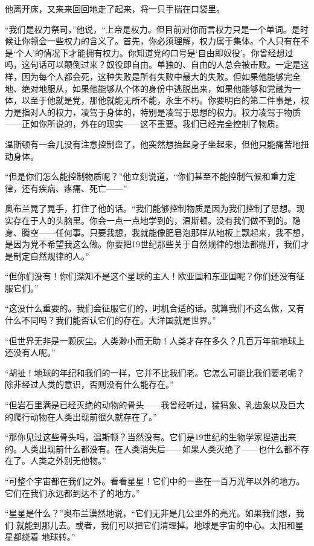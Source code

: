 他离开床，又来来回回地走了起来，将一只手揣在口袋里。

``我们是权力祭司，''他说，``上帝是权力。但目前对你而言权力只是一个单词。是时候让你领会一些权力的含义了。首先，你必须理解，权力属于集体。个人只有在不是`个人'的情况下才能拥有权力。你知道党的口号是`自由即奴役'。你曾经想过吗，这句话可以颠倒过来？奴役即自由。单独的、自由的人总会被击败。一定是这样，因为每个人都会死，这种失败是所有失败中最大的失败。但如果他能够完全地、绝对地服从，如果他能够从个体的身份中逃脱出来，如果他能够和党融为一体，以至于他就是党，那他就能无所不能，永生不朽。你要明白的第二件事是，权力是指对人的权力，凌驾于身体的，特别是凌驾于思想的权力。权力凌驾于物质——正如你所说的，外在的现实——这不重要。我们已经完全控制了物质。

温斯顿有一会儿没有注意控制盘了，他突然想抬起身子坐起来，但他只能痛苦地扭动身体。

``但是你们怎么能控制物质呢？''他立刻说道，``你们甚至不能控制气候和重力定律，还有疾病、疼痛、死亡——''

奥布兰晃了晃手，打住了他的话。``我们能够控制物质是因为我们控制了思想。现实存在于人的头脑里。你会一点一点地学到的，温斯顿。没有我们做不到的。隐身、腾空——任何事。只要我想，我就能像肥皂泡那样从地板上飘起来，我不想，是因为党不希望我这么做。你要把19世纪那些关于自然规律的想法都抛开，我们才是制定自然规律的人。''

``但你们没有！你们深知不是这个星球的主人！欧亚国和东亚国呢？你们还没有征服它们。''

``这没什么重要的。我们会征服它们的，时机合适的话。就算我们不这么做，又有什么不同吗？我们能否认它们的存在。大洋国就是世界。''

``但世界无非是一颗灰尘。人类渺小而无助！人类才存在多久？几百万年前地球上还没有人呢。''

``胡扯！地球的年纪和我们的一样，它并不比我们老。它怎么可能比我们要老呢？除非经过人类的意识，否则没有什么能存在。''

``但岩石里满是已经灭绝的动物的骨头——我曾经听过，猛犸象、乳齿象以及巨大的爬行动物在人类出现前很久就存在了。''

``那你见过这些骨头吗，温斯顿？当然没有。它们是19世纪的生物学家捏造出来的。人类出现前什么都没有。在人类消失后——如果人类灭绝了——也什么都不存在了。人类之外别无他物。''

``可整个宇宙都在我们之外。看看星星！它们中的一些在一百万光年以外的地方。它们在我们永远都到达不了的地方。''

``星星是什么？''奥布兰漠然地说，``它们无非是几公里外的亮光。如果我们想，我们
就能到那儿去。或者，我们可以把它们清理掉。地球是宇宙的中心。太阳和星星都绕着
地球转。''

